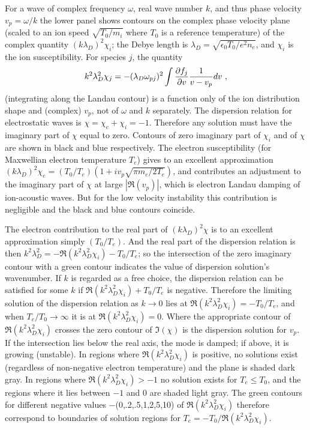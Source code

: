 \documentclass[pre]{revtex4-2}
\begin{document}
For a wave of complex frequency $\omega$, real wave number $k$, and
thus phase velocity $v_{p}=\omega/k$ the lower panel shows contours on
the complex phase velocity plane (scaled to an ion speed
$\sqrt{T_0/m_i}$ where $T_0$ is a reference temperature) of the
complex quantity $(k\lambda_D)^2\chi_i$; the Debye length is
$\lambda_D=\sqrt{\epsilon_0T_0/e^2n_e}$, and $\chi_i$ is the ion
susceptibility. For species $j$, the quantity
\begin{equation}\label{ionint}
  k^2\lambda_{D}^2 \chi_j = - (\lambda_D\omega_{pj})^2 \int  {\partial
    f_j\over \partial v } {1\over v- v_p} dv\ ,
\end{equation}
(integrating along the Landau contour) is a function only of the ion
distribution shape and (complex) $v_{p}$, not of $\omega$ and $k$
separately. The dispersion relation for electrostatic waves is
$\chi=\chi_e+\chi_i=-1$. Therefore any solution must have the
imaginary part of $\chi$ equal to zero. Contours of zero imaginary
part of $\chi_i$ and of $\chi$ are shown in black and blue
respectively. The electron susceptibility (for Maxwellian electron
temperature $T_e$) gives to an excellent approximation
$(k\lambda_D)^2\chi_e =(T_0/T_e)(1+iv_{p}\sqrt{\pi m_e/2T_e})$, and
contributes an adjustment to the imaginary part of $\chi$ at large
$|\Re(v_{p})|$, which is electron Landau damping of ion-acoustic
waves. But for the low velocity instability this contribution is
negligible and the black and blue contours coincide.

The electron contribution to the real part of $(k\lambda_D)^2\chi$ is
to an excellent approximation simply $(T_0/T_e)$. And the real part of
the dispersion relation is then
$k^2\lambda_D^2 = -\Re(k^2\lambda_D^2\chi_i )-T_0/T_e$; so the
intersection of the zero imaginary contour with a green contour
indicates the value of dispersion solution's wavenumber. If $k$ is
regarded as a free choice, the dispersion relation can be satisfied
for some $k$ if $\Re(k^2\lambda_D^2\chi_i )+T_0/T_e$ is
negative. Therefore the limiting solution of the dispersion relation
as $k\to 0$ lies at $\Re(k^2\lambda_D^2\chi_i )=-T_0/T_e$, and when
$T_e/T_0\to \infty$ it is at $\Re(k^2\lambda_D^2\chi_i)=0$. Where the
appropriate contour of $\Re(k^2\lambda_D^2\chi_i)$ crosses the zero
contour of $\Im(\chi)$ is the dispersion solution for $v_{p}$. If the
intersection lies below the real axis, the mode is damped; if above,
it is growing (unstable). In regions where $\Re(k^2\lambda_D^2\chi_i)$
is positive, no solutions exist (regardless of non-negative electron
temperature) and the plane is shaded dark gray. In regions where
$\Re(k^2\lambda_D^2\chi_i)>-1$ no solution exists for $T_e\le T_0$,
and the regions where it lies between $-1$ and $0$ are shaded light
gray. The green contours for different negative values
$-$(0,.2,.5,1,2,5,10) of
$\Re(k^2\lambda_D^2\chi_i)$ therefore correspond to boundaries of
solution regions for $T_e=-T_0/\Re(k^2\lambda_D^2\chi_i)$.
\end{document}
